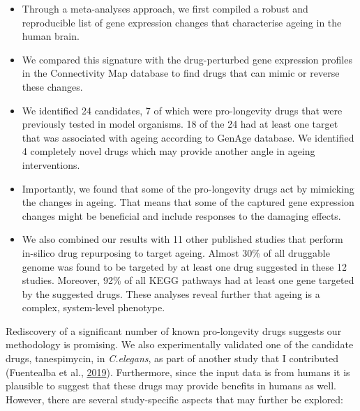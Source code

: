 \documentclass[12pt,twoside]{unicam}
\providecommand{\tightlist}{%
  \setlength{\itemsep}{0pt}\setlength{\parskip}{0pt}}
\begin{document}
\begin{itemize}
\tightlist
\item
  Through a meta-analyses approach, we first compiled a robust and reproducible list of gene expression changes that characterise ageing in the human brain.
\item
  We compared this signature with the drug-perturbed gene expression profiles in the Connectivity Map database to find drugs that can mimic or reverse these changes.
\item
  We identified 24 candidates, 7 of which were pro-longevity drugs that were previously tested in model organisms. 18 of the 24 had at least one target that was associated with ageing according to GenAge database. We identified 4 completely novel drugs which may provide another angle in ageing interventions.
\item
  Importantly, we found that some of the pro-longevity drugs act by mimicking the changes in ageing. That means that some of the captured gene expression changes might be beneficial and include responses to the damaging effects.
\item
  We also combined our results with 11 other published studies that perform in-silico drug repurposing to target ageing. Almost 30\% of all druggable genome was found to be targeted by at least one drug suggested in these 12 studies. Moreover, 92\% of all KEGG pathways had at least one gene targeted by the suggested drugs. These analyses reveal further that ageing is a complex, system-level phenotype.
\end{itemize}

Rediscovery of a significant number of known pro-longevity drugs suggests our methodology is promising. We also experimentally validated one of the candidate drugs, tanespimycin, in \emph{C.elegans}, as part of another study that I contributed (Fuentealba et al., \protect\hyperlink{ref-Fuentealba2019}{2019}). Furthermore, since the input data is from humans it is plausible to suggest that these drugs may provide benefits in humans as well. However, there are several study-specific aspects that may further be explored:
\end{document}
